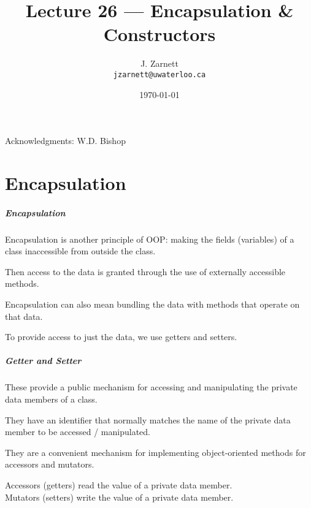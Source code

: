 

\title{Lecture 26 --- Encapsulation \& Constructors}

\author{J. Zarnett\\
\texttt{jzarnett@uwaterloo.ca}}
\date{\today}



\begin{frame}
  \titlepage
  
  \begin{center}
  \small{Acknowledgments: W.D. Bishop}
  \end{center}
\end{frame}

\part{Encapsulation}
\begin{frame}\partpage\end{frame}

\begin{frame}
\frametitle{Encapsulation}
\alert{Encapsulation} is another principle of OOP: making the fields (variables) of a class inaccessible from outside the class.

Then access to the data is granted through the use of externally accessible methods.

Encapsulation can also mean bundling the data with methods that operate on that data.

To provide access to just the data, we use \alert{getter}s and \alert{setter}s.

\end{frame}


\begin{frame}
\frametitle{Getter and Setter}

These provide a public mechanism for accessing and manipulating the private data members of a class.

They have an identifier that normally matches the name of the private data member to be accessed / manipulated.

They are a convenient mechanism for implementing object-oriented methods for accessors and mutators.

\alert{Accessors} (getters) read the value of a private data member.\\
\alert{Mutators} (setters) write the value of a private data member.

\end{frame}

